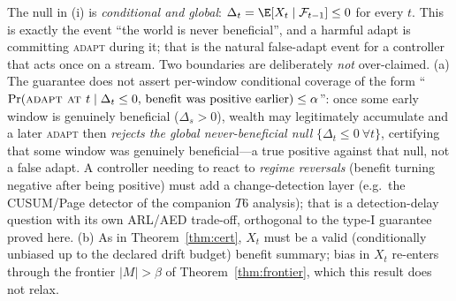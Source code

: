 \begin{remark}\label{rmk:scope}
The null in (i) is \emph{conditional and global}: $\Delta_t=\E[X_t\mid\mathcal
F_{t-1}]\le0$ for every $t$. This is exactly the event ``the world is never
beneficial'', and a harmful adapt is committing \textsc{adapt} during it; that is
the natural false-adapt event for a controller that acts once on a stream. Two
boundaries are deliberately \emph{not} over-claimed. (a) The guarantee does not
assert per-window conditional coverage of the form ``$\Pr(\textsc{adapt at }t\mid
\Delta_t\le0,\,\text{benefit was positive earlier})\le\alpha$'': once some early
window is genuinely beneficial ($\Delta_s>0$), wealth may legitimately accumulate
and a later \textsc{adapt} then \emph{rejects the global never-beneficial null}
$\{\Delta_t\le0\ \forall t\}$, certifying that some window was genuinely
beneficial---a true positive against that null, not a false adapt. A controller
needing to react to \emph{regime reversals} (benefit turning negative after being
positive) must add a change-detection layer (e.g.\ the CUSUM/Page detector of the
companion $T6$ analysis); that is a detection-delay question with its own
ARL/AED trade-off, orthogonal to the type-I guarantee proved here. (b) As in
Theorem~\ref{thm:cert}, $X_t$ must be a valid (conditionally unbiased up to the
declared drift budget) benefit summary; bias in $X_t$ re-enters through the
frontier $|M|>\beta$ of Theorem~\ref{thm:frontier}, which this result does not
relax.
\end{remark}
